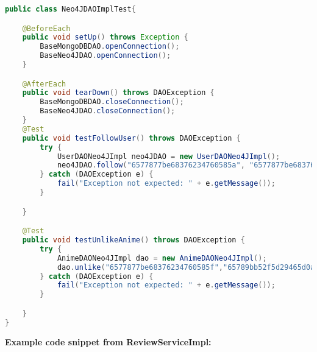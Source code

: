 \begin{mdframed}[style=customstyle]
\begin{lstlisting}[language=java]
public class Neo4JDAOImplTest{

    @BeforeEach
    public void setUp() throws Exception {
        BaseMongoDBDAO.openConnection();
        BaseNeo4JDAO.openConnection();
    }

    @AfterEach
    public void tearDown() throws DAOException {
        BaseMongoDBDAO.closeConnection();
        BaseNeo4JDAO.closeConnection();
    }
    @Test
    public void testFollowUser() throws DAOException {
        try {
            UserDAONeo4JImpl neo4JDAO = new UserDAONeo4JImpl();
            neo4JDAO.follow("6577877be68376234760585a", "6577877be683762347605859");
        } catch (DAOException e) {
            fail("Exception not expected: " + e.getMessage());
        }

    }

    @Test
    public void testUnlikeAnime() throws DAOException {
        try {
            AnimeDAONeo4JImpl dao = new AnimeDAONeo4JImpl();
            dao.unlike("6577877be68376234760585f","65789bb52f5d29465d0abd09");
        } catch (DAOException e) {
            fail("Exception not expected: " + e.getMessage());
        }

    }
}\end{lstlisting}
\end{mdframed}


\textbf{Example code snippet from ReviewServiceImpl:}

